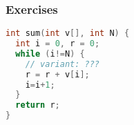\documentclass[aspectratio=169]{beamer}
\begin{document}
\begin{frame}[fragile]\frametitle{Exercises}

\begin{lstlisting}[language=C++]
int sum(int v[], int N) {
  int i = 0, r = 0;
  while (i!=N) {
    // variant: ???
    r = r + v[i];
    i=i+1;
  }
  return r;
}
\end{lstlisting}

~\\[-10mm]


\end{frame}
\end{document}
